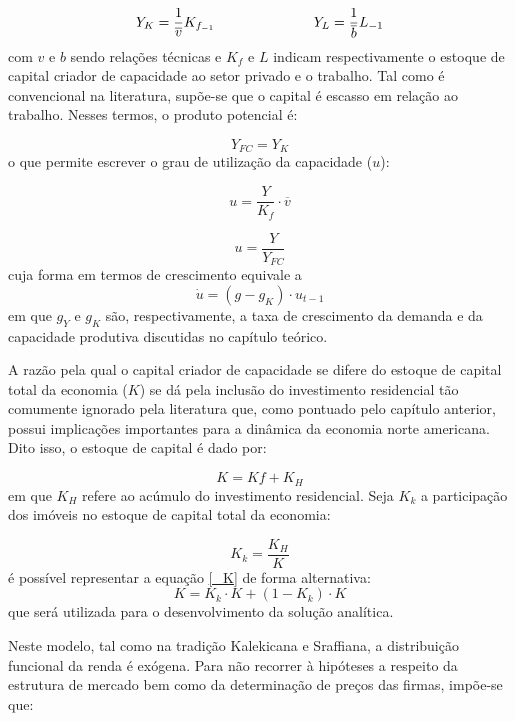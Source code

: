 $$
Y_K = \frac{1}{\overline v}K_{f_{-1}} \hspace{2.5cm} Y_L = \frac{1}{\overline b}L_{-1}
$$
com $v$ e $b$ sendo relações técnicas e $K_f$ e $L$ indicam respectivamente o estoque de capital criador de capacidade ao setor privado e  o trabalho. Tal como é convencional na literatura, supõe-se que o capital é escasso em relação ao trabalho. Nesses termos, o produto potencial é:

\begin{equation}
\label{_YFC}
    Y_{FC} = Y_K
\end{equation}
o que permite escrever o grau de utilização da capacidade ($u$):

$$
u = \frac{Y}{K_f}\cdot \overline v
$$

\begin{equation}
\label{_u}
    u = \frac{Y}{Y_{FC}}
\end{equation}
cuja forma em termos de crescimento equivale a
\begin{equation}
\label{Aux}
\tag{Aux.}
\dot u = (g - g_K)\cdot u_{t-1}
\end{equation}
em que $g_Y$ e $g_K$ são, respectivamente, a taxa de crescimento da demanda e da capacidade produtiva discutidas no capítulo teórico.


A razão pela qual o capital criador de capacidade se difere do estoque de capital total da economia ($K$) se dá pela inclusão do investimento residencial tão comumente ignorado pela literatura que, como pontuado pelo capítulo anterior, possui implicações importantes para a dinâmica da economia norte americana. Dito isso, o estoque de capital é dado por:

\begin{equation}
\label{_K}
    K = Kf + K_{H}
\end{equation}
em que $K_H$ refere ao acúmulo do investimento residencial. Seja $K_k$ a participação dos imóveis no estoque de capital total da economia:

\begin{equation}
\label{_tau}
K_k = \frac{K_H}{K}    
\end{equation}
é possível representar a equação \ref{_K} de forma alternativa:
$$
K = K_k\cdot K + (1-K_k)\cdot K
$$
que será utilizada para o desenvolvimento da solução analítica.

Neste modelo, tal como na tradição Kalekicana e Sraffiana, a distribuição funcional da renda é exógena. Para não recorrer à hipóteses a respeito da estrutura de mercado bem como da determinação de preços das firmas, impõe-se que:


